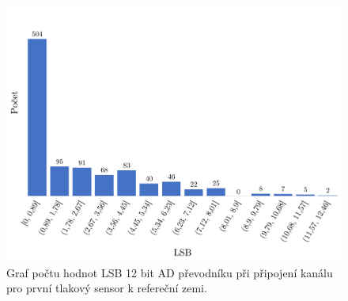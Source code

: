 \begin{figure}[H]
    \caption{Graf počtu hodnot LSB 12 bit AD převodníku při připojení kanálu pro první tlakový sensor k refereční zemi.}
    \label{fig:hist_vacuum1_gnd}
    \includegraphics[width=1\textwidth]{graphs/vacuum1_gnd.png}

\end{figure}


